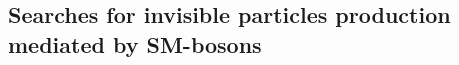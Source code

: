 \subsection{Searches for invisible particles production mediated by SM-bosons}
\label{sec:results_ZHSearches}





